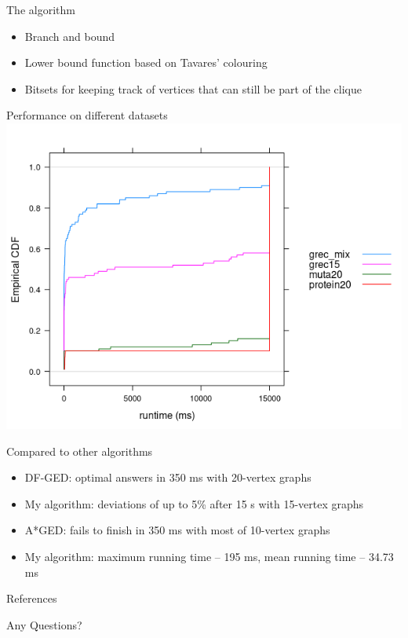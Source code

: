 \documentclass{beamer}
\begin{document}
\begin{frame}{The algorithm}
  \begin{itemize}
  \item Branch and bound
  \item Lower bound function based on Tavares' colouring \cite{DBLP:phd/hal/tavares16}
  \item Bitsets for keeping track of vertices that can still be part of the clique
  \end{itemize}
\end{frame}
\begin{frame}{Performance on different datasets}
  \includegraphics[scale=0.6]{../ecdfs.png}
\end{frame}
\begin{frame}{Compared to other algorithms \cite{DBLP:conf/icpram/Abu-AishehRRM15}}
  \begin{itemize}
  \item DF-GED: optimal answers in 350 ms with 20-vertex graphs
  \item My algorithm: deviations of up to 5\% after 15 s with 15-vertex graphs
  \end{itemize}
  \begin{itemize}
  \item A*GED: fails to finish in 350 ms with most of 10-vertex graphs
  \item My algorithm: maximum running time -- 195 ms, mean running time -- 34.73 ms
  \end{itemize}
\end{frame}
\begin{frame}[allowframebreaks]{References}
  \printbibliography
\end{frame}
\begin{frame}[plain,c]
\begin{center}
  \Huge Any Questions?
\end{center}
\end{frame}
\end{document}
